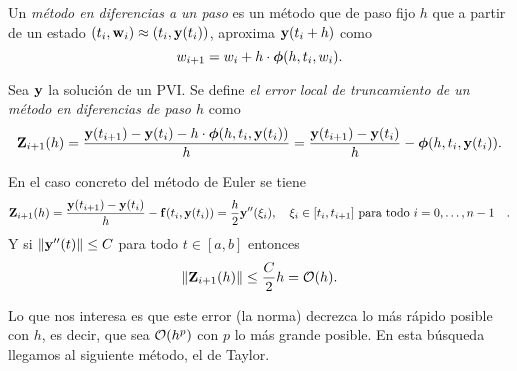 \begin{definition}
    Un \emph{método en diferencias a un paso} es un método que de paso fijo $h$
    que a partir de un estado $(t_i, \vb{w}{}_i) \approx (t_i, \vb{y}{}(t_i))$,
    aproxima $\vb{y}{}(t_i + h)$ como
    \begin{equation*}
        w_{i+1} = w_i + h\cdot \vb*{\phi}(h, t_i, w_i).
    \end{equation*}
\end{definition}

\begin{definition}\label{def:elt}
    Sea $\vb{y}{}$ la solución de un PVI.
    Se define \emph{el error local de truncamiento
    de un método en diferencias de paso $h$} como
    \begin{equation*}
        \vb{Z}{}_{i+1}(h) =
        \frac{\vb{y}{}(t_{i+1}) - \vb{y}{}(t_i) - h\cdot \vb*{\phi}(h, t_i, \vb{y}{}(t_i))}{h} =
        \frac{\vb{y}{}(t_{i+1}) - \vb{y}{}(t_i)}{h} - \vb*{\phi}(h, t_i, \vb{y}{}(t_i)).
    \end{equation*}
\end{definition}



\begin{example}
    En el caso concreto del método de Euler se tiene
    \begin{equation*}
        \ELT_{i+1}(h) =
        \frac{\vy(t_{i+1}) - \vy(t_i)}{h} - \vf(t_i,\vy(t_i)) =
        \frac{h}{2} \vy''(\xi_i),
            \qq{$\xi_i \in [t_i, t_{i+1}]$ para todo $i=0,\dots, n-1$}.
    \end{equation*}
    Y si $\norm{\vb{y}{}''(t)} \le C$ para todo $t \in [a, b]$ entonces
    \begin{equation*}
        \norm{\vb{Z}{}_{i+1}(h)} \le \frac{C}{2}h = \vb{\mathcal{O}}{}(h).
    \end{equation*}

    Lo que nos interesa es que este error (la norma)
    decrezca lo más rápido posible con $h$,
    es decir, que sea $\vb{\mathcal{O}}{}(h^p)$ con $p$ lo más grande posible.
    En esta búsqueda llegamos al siguiente método, el de Taylor.
\end{example}

